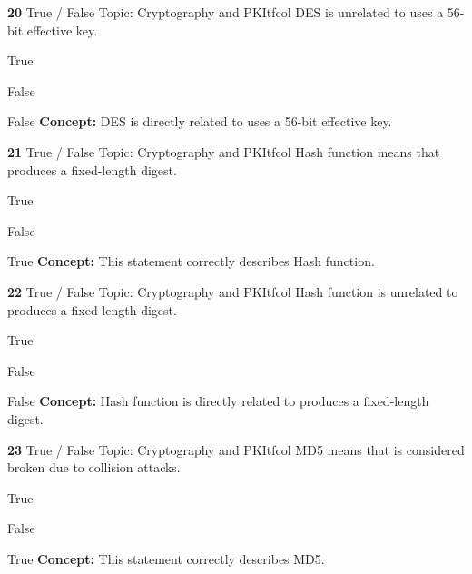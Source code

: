 \documentclass[10pt,a4paper]{article}
\begin{document}
\begin{qcard}{\color{white}\textbf{20} \hfill \small True / False \textbar{} Topic: Cryptography and PKI}{tfcol}
DES is unrelated to uses a 56-bit effective key.

\begin{qoptions}
\item True
\item False
\end{qoptions}
\begin{explainbox}{False}
\textbf{Concept:} DES is directly related to uses a 56-bit effective key.
\end{explainbox}
\end{qcard}

\begin{qcard}{\color{white}\textbf{21} \hfill \small True / False \textbar{} Topic: Cryptography and PKI}{tfcol}
Hash function means that produces a fixed-length digest.

\begin{qoptions}
\item True
\item False
\end{qoptions}
\begin{explainbox}{True}
\textbf{Concept:} This statement correctly describes Hash function.
\end{explainbox}
\end{qcard}

\begin{qcard}{\color{white}\textbf{22} \hfill \small True / False \textbar{} Topic: Cryptography and PKI}{tfcol}
Hash function is unrelated to produces a fixed-length digest.

\begin{qoptions}
\item True
\item False
\end{qoptions}
\begin{explainbox}{False}
\textbf{Concept:} Hash function is directly related to produces a fixed-length digest.
\end{explainbox}
\end{qcard}

\begin{qcard}{\color{white}\textbf{23} \hfill \small True / False \textbar{} Topic: Cryptography and PKI}{tfcol}
MD5 means that is considered broken due to collision attacks.

\begin{qoptions}
\item True
\item False
\end{qoptions}
\begin{explainbox}{True}
\textbf{Concept:} This statement correctly describes MD5.
\end{explainbox}
\end{qcard}
\end{document}
